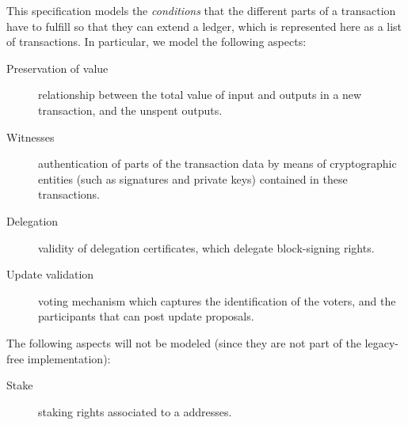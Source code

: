 This specification models the \textit{conditions} that the different parts of a
transaction have to fulfill so that they can extend a ledger, which is
represented here as a list of transactions. In particular, we model the
following aspects:

\begin{description}
\item[Preservation of value] relationship between the total value of input and
  outputs in a new transaction, and the unspent outputs.
\item[Witnesses] authentication of parts of the transaction data by means of
  cryptographic entities (such as signatures and private keys) contained in
  these transactions.
\item[Delegation] validity of delegation certificates, which delegate
  block-signing rights.
\item[Update validation] voting mechanism which captures the identification of
  the voters, and the participants that can post update proposals.
\end{description}

The following aspects will not be modeled (since they are not part of the legacy-free
implementation):
\begin{description}
\item[Stake] staking rights associated to a addresses.
\end{description}
